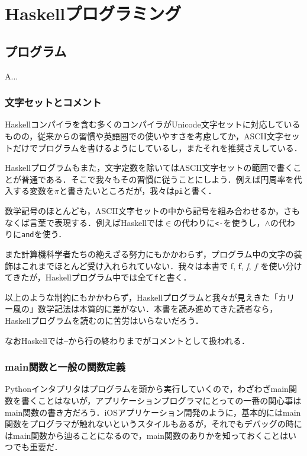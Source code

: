 \documentclass[a4paper]{jsbook}
\newcommand{\programminglanguage}[1]{\textsf{#1}}
\newcommand{\haskell}{\programminglanguage{Haskell}}
\newcommand{\python}{\programminglanguage{Python}}
\newenvironment{leader}{\begingroup}{\endgroup}
\newcommand{\code}[1]{\texttt{#1}}
\begin{document}
\part{\haskell プログラミング}

\chapter{プログラム}

\begin{leader}
A...
\end{leader}


\section{文字セットとコメント}

\haskell コンパイラを含む多くのコンパイラがUnicode文字セットに対応しているものの，従来からの習慣や英語圏での使いやすさを考慮してか，ASCII文字セットだけでプログラムを書けるようにしているし，またそれを推奨さえしている．

\haskell プログラムもまた，文字定数を除いてはASCII文字セットの範囲で書くことが普通である．そこで我々もその習慣に従うことにしよう．例えば円周率を代入する変数を$\pi$と書きたいところだが，我々は\code{pi}と書く．

数学記号のほとんども，ASCII文字セットの中から記号を組み合わせるか，さもなくば言葉で表現する．例えば\haskell では$\in$の代わりに\code{<-}を使うし，$\wedge$の代わりに\code{and}を使う．

また計算機科学者たちの絶えざる努力にもかかわらず，プログラム中の文字の装飾はこれまでほとんど受け入れられていない．我々は本書で \textrm{f}, \textbf{f}, \textit{f}, $f$ を使い分けてきたが，\haskell プログラム中では全て\code{f}と書く．

以上のような制約にもかかわらず，\haskell プログラムと我々が見えきた「カリー風の」数学記法は本質的に差がない．本書を読み進めてきた読者なら，\haskell プログラムを読むのに苦労はいらないだろう．

なお\haskell では\code{--}から行の終わりまでがコメントとして扱われる．

\section{main関数と一般の関数定義}

\python インタプリタはプログラムを頭から実行していくので，わざわざmain関数を書くことはないが，アプリケーションプログラマにとっての一番の関心事はmain関数の書き方だろう．iOSアプリケーション開発のように，基本的にはmain関数をプログラマが触れないというスタイルもあるが，それでもデバッグの時にはmain関数から辿ることになるので，main関数のありかを知っておくことはいつでも重要だ．
\end{document}
